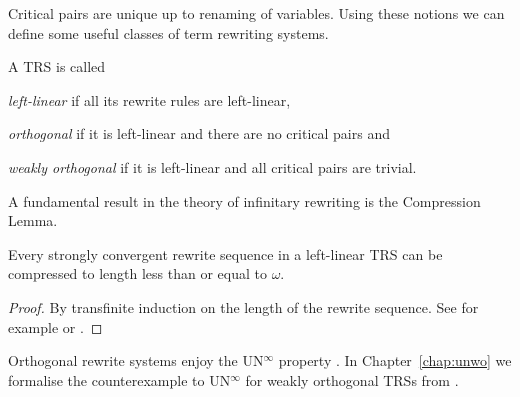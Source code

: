 Critical pairs are unique up to renaming of variables. Using these
notions we can define some useful classes of term rewriting systems.



\begin{definition}%
A TRS is called
\begin{compactenum}
  \item \emph{left-linear} if all its rewrite rules are left-linear,
  \item \emph{orthogonal} if it is left-linear and there are no critical pairs and
  \item \emph{weakly orthogonal} if it is left-linear and all critical pairs
    are trivial.
\end{compactenum}
\end{definition}

A fundamental result in the theory of infinitary rewriting is the
Compression Lemma.
\begin{lemma}\label{lem:compression}
  Every strongly convergent rewrite sequence in a left-linear TRS can
  be compressed to length less than or equal to $\omega$.
\end{lemma}
\begin{proof}
  By transfinite induction on the length of the rewrite sequence. See
  for example \citet[Theorem 12.7.1, page 689]{terese-03} or
  \citet{endrullis-10}.
\end{proof}

Orthogonal rewrite systems enjoy the UN$^\infty$ property
\citep{kennaway-95,klop-de-vrijer-05}. In Chapter~\ref{chap:unwo} we
formalise the counterexample to UN$^\infty$ for weakly orthogonal TRSs
from \citet{endrullis-10}.
